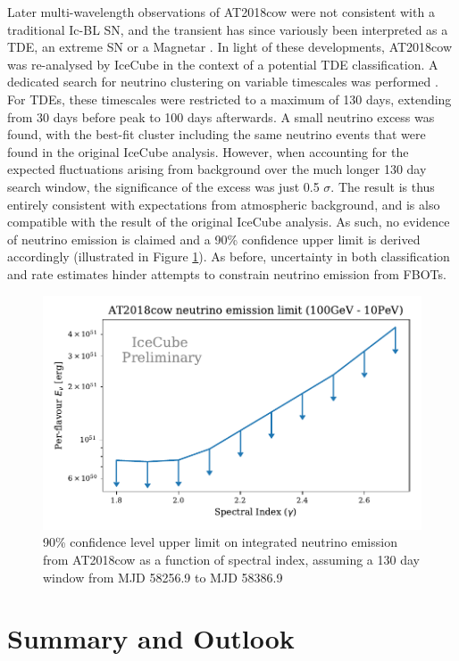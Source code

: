 \documentclass{PoS}
\begin{document}
Later multi-wavelength observations of AT2018cow were not consistent with a traditional Ic-BL SN, and the transient has since variously been interpreted as a TDE, an extreme SN or a Magnetar \cite{Perley:2018oky}. In light of these developments, AT2018cow was re-analysed by IceCube in the context of a potential TDE classification. A dedicated search for neutrino clustering on variable timescales was performed \cite{IceCube:2018cha}. For TDEs, these timescales were restricted to a maximum of 130 days, extending from 30 days before peak to 100 days afterwards. A small neutrino excess was found, with the best-fit cluster including the same neutrino events that were found in the original IceCube analysis. However, when accounting for the expected fluctuations arising from background over the much longer 130 day search window, the significance of the excess was just 0.5 $\sigma$. The result is thus entirely consistent with expectations from atmospheric background, and is also compatible with the result of the original IceCube analysis. As such, no evidence of neutrino emission is claimed and a 90\% confidence upper limit is derived accordingly (illustrated in Figure \ref{fig:At2018cow}). As before, uncertainty in both classification and rate estimates hinder attempts to constrain neutrino emission from FBOTs.

\begin{figure}[!ht]
	\centering \includegraphics[width=.9\textwidth]{figures/AT2018cow_limit_plot}
	\caption{90\% confidence level upper limit on integrated neutrino emission from AT2018cow as a function of spectral index, assuming a 130 day window from MJD 58256.9 to MJD 58386.9}
	\label{fig:At2018cow}
\end{figure}

\section{Summary and Outlook}
\end{document}
